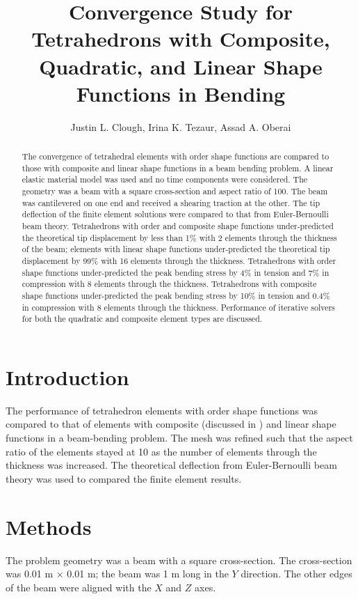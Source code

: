 \documentclass[a4paper, 12pt]{article}
\author{Justin L. Clough, 
        Irina K. Tezaur,
        Assad A. Oberai}
\title{Convergence Study for Tetrahedrons with Composite, Quadratic, and Linear Shape Functions in Bending}
\begin{document}
\maketitle

\begin{abstract}
The convergence of tetrahedral elements with
 order shape functions are compared to those with composite
and linear shape functions
in a beam bending problem.
A linear elastic material model was used
and no time components were considered.
The geometry was a beam with a square cross-section and 
aspect ratio of 100.
The beam was cantilevered on one end and received a 
shearing traction at the other. 
The tip deflection of the finite element solutions were
compared to that from Euler-Bernoulli beam theory. 
Tetrahedrons with  order and composite shape functions under-predicted
the theoretical tip displacement by less than 1\% with 2 elements 
through the thickness of the beam;
elements with linear shape functions under-predicted 
the theoretical tip displacement by 99\% with 16 elements through the thickness.
Tetrahedrons with  order shape functions under-predicted 
the peak bending stress by 4\% in tension and 7\% in compression
with 8 elements through the thickness.
Tetrahedrons with composite shape functions under-predicted 
the peak bending stress by 10\% in tension and 0.4\% in compression
with 8 elements through the thickness.
Performance of iterative solvers for both the 
quadratic and composite element types are discussed.

\end{abstract}

\section{Introduction}
The performance of tetrahedron elements with  order shape functions
was compared to that of elements with composite
(discussed in \cite{bib:composite_tet})
and linear shape functions in a beam-bending problem.
The mesh was refined such that the aspect ratio of the elements
stayed at 10 as the number of elements through the thickness was increased.
The theoretical deflection from Euler-Bernoulli beam theory was used to
compared the finite element results.

\section{Methods}
The problem geometry was a beam with a square cross-section.
The cross-section was 0.01 m $ \times $ 0.01 m; 
the beam was 1 m long in the $Y$ direction.
The other edges of the beam were aligned with the $X$ and $Z$ axes.
\end{document}
